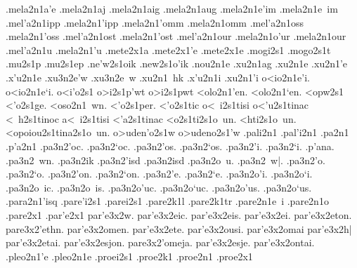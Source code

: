 {.mela2n1a'e
.mela2n1aj			%
.mela2n1aig 		%
.mela2n1aug 		%
.mela2n1e'im 		%
.mela2n1e~im 		%
.mel'a2n1ipp 		%
.mela2n1'ipp
.mela2n1'omm 		%
.mela2n1omm
.mel'a2n1oss 		%
.mela2n1'oss
.mel'a2n1ost 		%
.mela2n1'ost
.mel'a2n1our 		%
.mela2n1o'ur
.mela2n1our  		%
.mel'a2n1u		%
.mela2n1'u
.mete2x1a   		%
.mete2x1'e  		%
.mete2x1e
.mogi2s1    		%
.mogo2s1t    		%
.mu2s1p      		%
.mu2s1ep   		%
.ne'w2s1oik  		%
.new2s1o'ik
.nou2n1e     		%
.xu2n1ag		%
.xu2n1e
.xu2n1'e
.x'u2n1e
	.xu3n2e'w 		%
	.xu3n2e~w
.xu2n1~hk 		%
.x'u2n1i  		%
.xu2n1'i  		%
o<io2n1e'i.		%
o<io2n1e`i.
o<i'o2s1		%
o>i2s1p'wt 		%
o>i2s1pwt
<olo2n1'en.
<olo2n1`en.
<opw2s1			%
<'o2s1ge.               %
<oso2n1~wn.  		%
<'o2s1per.		%
<'o2s1tic 		%
 o<~i2s1tisi		%
 o<'u2s1tinac		%
 <~h2s1tinoc 		%
 a<~i2s1tisi   		%
 <'a2s1tinac 		%
 <o2s1ti2s1o~un.	%
 <hti2s1o~un.  		%
 <opoiou2s1tina2s1o~un.	%
o>uden'o2s1w 		%
o>udeno2s1'w 		
.pali2n1 		%
.pal'i2n1 		%
.pa2n1
.p'a2n1
	.pa3n2'oc. 		%
	.pa3n2`oc.
	.pa3n2'os.
	.pa3n2`os.
	.pa3n2'i.
	.pa3n2`i.
	.p'ana.
	.pa3n2~wn.
	.pa3n2ik  		%
	.pa3n2'isd 		%
	.pa3n2isd  		%
	.pa3n2o~u. 		%
	.pa3n2~w|.
	.pa3n2'o.
	.pa3n2`o.
	.pa3n2'on.
	.pa3n2`on.
	.pa3n2'e.
	.pa3n2`e.
	.pa3n2o'i.
	.pa3n2o`i.
	.pa3n2o~ic.
	.pa3n2o~is.
	.pa3n2o'uc.
	.pa3n2o`uc.
	.pa3n2o'us.
	.pa3n2o`us.
.para2n1'isq 		%
.pare'i2s1 		%
.parei2s1
.pare2k1l 		%
.pare2k1tr 		%
.pare2n1e~i 		%
.pare2n1o 		%
.pare2x1
.par'e2x1
	par'e3x2w.		%
	par'e3x2eic.
	par'e3x2eis.
	par'e3x2ei.
	par'e3x2eton.
	pare3x2'ethn.
	par'e3x2omen.
	par'e3x2ete.
	par'e3x2ousi.
	par'e3x2omai
	par'e3x2h|
	par'e3x2etai.
	par'e3x2esjon.
	pare3x2'omeja.
	par'e3x2esje.
	par'e3x2ontai.
.pleo2n1'e 		%
.pleo2n1e
.proei2s1 		%
.proe2k1 		%
.proe2n1 		%
.proe2x1 		%
}

